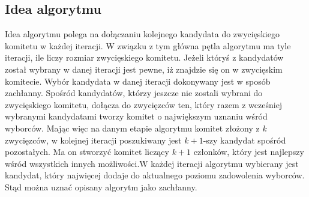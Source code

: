 \documentclass[pdflatex,11pt]{../aghdoc_version2}
\begin{document}
\subsection{Idea algorytmu}
Idea algorytmu polega na dołączaniu kolejnego kandydata do zwycięskiego komitetu w
każdej iteracji. W związku z tym główna pętla algorytmu ma tyle iteracji, ile liczy rozmiar zwycięskiego komitetu. Jeżeli któryś z kandydatów został wybrany w danej iteracji jest
pewne, iż znajdzie się on w zwycięskim komitecie. Wybór kandydata w danej iteracji
dokonywany jest w sposób zachłanny. Spośród kandydatów, którzy jeszcze nie zostali
wybrani do zwycięskiego komitetu, dołącza do zwycięzców ten, który razem z wcześniej
wybranymi kandydatami tworzy komitet o największym uznaniu wśród wyborców. Mając
więc na danym etapie algorytmu komitet złożony z $k$ zwycięzców, w kolejnej iteracji
poszukiwany jest $k+1$-szy kandydat spośród pozostałych. Ma on stworzyć komitet liczący
$k+1$ członków, który jest najlepszy wśród wszystkich innych możliwości.W każdej iteracji
algorytmu wybierany jest kandydat, który najwięcej dodaje do aktualnego poziomu
zadowolenia wyborców. Stąd można uznać opisany algorytm jako zachłanny.
\end{document}
